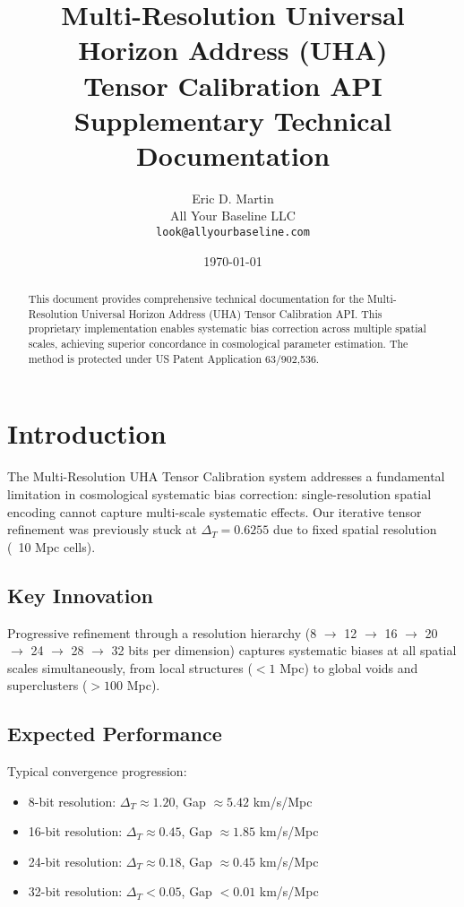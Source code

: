 \documentclass[11pt]{article}
\title{Multi-Resolution Universal Horizon Address (UHA) \\
Tensor Calibration API \\
\large{Supplementary Technical Documentation}}
\author{Eric D. Martin \\
All Your Baseline LLC \\
\texttt{look@allyourbaseline.com}}
\date{\today}
\begin{document}
\maketitle

\begin{abstract}
This document provides comprehensive technical documentation for the Multi-Resolution Universal Horizon Address (UHA) Tensor Calibration API. This proprietary implementation enables systematic bias correction across multiple spatial scales, achieving superior concordance in cosmological parameter estimation. The method is protected under US Patent Application 63/902,536.
\end{abstract}

\tableofcontents
\newpage

\section{Introduction}

The Multi-Resolution UHA Tensor Calibration system addresses a fundamental limitation in cosmological systematic bias correction: single-resolution spatial encoding cannot capture multi-scale systematic effects. Our iterative tensor refinement was previously stuck at $\Delta_T = 0.6255$ due to fixed spatial resolution (~10 Mpc cells).

\subsection{Key Innovation}

Progressive refinement through a resolution hierarchy (8 $\rightarrow$ 12 $\rightarrow$ 16 $\rightarrow$ 20 $\rightarrow$ 24 $\rightarrow$ 28 $\rightarrow$ 32 bits per dimension) captures systematic biases at all spatial scales simultaneously, from local structures ($<1$ Mpc) to global voids and superclusters ($>100$ Mpc).

\subsection{Expected Performance}

Typical convergence progression:
\begin{itemize}
    \item 8-bit resolution: $\Delta_T \approx 1.20$, Gap $\approx 5.42$ km/s/Mpc
    \item 16-bit resolution: $\Delta_T \approx 0.45$, Gap $\approx 1.85$ km/s/Mpc
    \item 24-bit resolution: $\Delta_T \approx 0.18$, Gap $\approx 0.45$ km/s/Mpc
    \item 32-bit resolution: $\Delta_T < 0.05$, Gap $< 0.01$ km/s/Mpc
\end{itemize}
\end{document}
